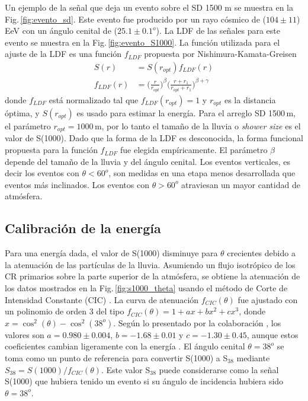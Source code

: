 Un ejemplo de la señal que deja un evento sobre el SD 1500 m se muestra en la Fig.\,\ref{fig:evento_sd}. Este evento fue producido por un rayo cósmico de ($104\pm11$)\,EeV con un ángulo cenital de ($25.1\pm0.1 ^o$). La LDF de las señales para este evento se muestra en la Fig.\,\ref{fig:evento_S1000}. La función utilizada para el ajuste de la LDF es una función  $f_{LDF}$ propuesta por Nishimura-Kamata-Greisen \cite{data}
\begin{align*}
	S(r) &= S(r_{opt})f_{LDF}(r)\\
	f_{LDF}(r)&=\bigg(\frac{r}{r_{opt}}\bigg)^{\beta}\bigg(\frac{r+r_1}{r_{opt}+r_1}\bigg)^{\beta + \gamma}
\end{align*}
donde $f_{LDF}$ está normalizado tal que $f_{LDF}(r_{opt})=1$ y $r_{opt}$ es la distancia óptima, %
y $S(r_{opt})$ es usado para estimar la energía. Para el arreglo SD 1500\,m, el parámetro $r_{opt}=1000\,$m, por lo tanto el tamaño de la lluvia o \emph{shower size} es el valor de S(1000). Dado que la forma de la LDF es desconocida, la forma funcional propuesta para la función $f_{LDF}$ fue elegida empíricamente.  El parámetro $\beta$ depende del tamaño de la lluvia y del ángulo cenital. Los eventos verticales, es decir los eventos con $\theta < 60^o$, son medidas en una etapa menos desarrollada que eventos más inclinados. Los eventos con $\theta>60^o$ atraviesan un mayor cantidad de atmósfera.

\subsection{Calibración de la energía} \label{sec:gamma_B}

Para una energía dada, el valor de S(1000) disminuye para $\theta$ crecientes debido a la atenuación de las partículas de la lluvia. Asumiendo un flujo isotrópico de los CR primarios sobre la parte superior de la atmósfera, se obtiene la atenuación de los datos mostrados en la Fig.\,\ref{fig:s1000_theta}  usando el método de Corte de Intensidad Constante (CIC) \cite{CIC}. La curva de atenuación $f_{CIC}(\theta)$ fue ajustado con un polinomio de orden 3 del tipo $f_{CIC}(\theta)=1+ax+bx^2+cx^3$, donde $x=\cos^2(\theta) - \cos^2(38^o)$. Según lo presentado por la colaboración \cite{collaboration2013pierre}, los valores son $a=0.980\pm0.004$, $b=-1.68\pm0.01$ y $c=-1.30\pm 0.45$, aunque estos coeficientes cambian ligeramente con la energía \cite{data}. El ángulo cenital $\theta=38^o$ se toma como un punto de referencia para convertir S(1000) a S$_{38}$ mediante $S_{38}=S(1000)/f_{CIC}(\theta)$. Este valor S$_{38}$ puede considerarse como la señal S(1000) que hubiera tenido un evento si su ángulo de incidencia hubiera sido $\theta=38^o$.


